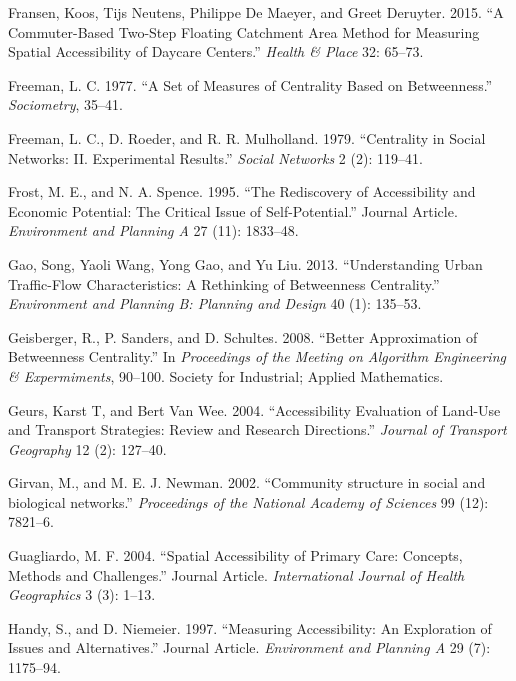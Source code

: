 \documentclass[]{elsarticle} %
\begin{document}
\leavevmode\hypertarget{ref-fransen2015commuter}{}%
Fransen, Koos, Tijs Neutens, Philippe De Maeyer, and Greet Deruyter.
2015. ``A Commuter-Based Two-Step Floating Catchment Area Method for
Measuring Spatial Accessibility of Daycare Centers.'' \emph{Health \&
Place} 32: 65--73.

\leavevmode\hypertarget{ref-Freeman1977}{}%
Freeman, L. C. 1977. ``A Set of Measures of Centrality Based on
Betweenness.'' \emph{Sociometry}, 35--41.

\leavevmode\hypertarget{ref-Freeman1979}{}%
Freeman, L. C., D. Roeder, and R. R. Mulholland. 1979. ``Centrality in
Social Networks: II. Experimental Results.'' \emph{Social Networks} 2
(2): 119--41.

\leavevmode\hypertarget{ref-Frost1995}{}%
Frost, M. E., and N. A. Spence. 1995. ``The Rediscovery of Accessibility
and Economic Potential: The Critical Issue of Self-Potential.'' Journal
Article. \emph{Environment and Planning A} 27 (11): 1833--48.

\leavevmode\hypertarget{ref-gao2013understanding}{}%
Gao, Song, Yaoli Wang, Yong Gao, and Yu Liu. 2013. ``Understanding Urban
Traffic-Flow Characteristics: A Rethinking of Betweenness Centrality.''
\emph{Environment and Planning B: Planning and Design} 40 (1): 135--53.

\leavevmode\hypertarget{ref-Geisberger2008}{}%
Geisberger, R., P. Sanders, and D. Schultes. 2008. ``Better
Approximation of Betweenness Centrality.'' In \emph{Proceedings of the
Meeting on Algorithm Engineering \& Expermiments}, 90--100. Society for
Industrial; Applied Mathematics.

\leavevmode\hypertarget{ref-Geurs2004}{}%
Geurs, Karst T, and Bert Van Wee. 2004. ``Accessibility Evaluation of
Land-Use and Transport Strategies: Review and Research Directions.''
\emph{Journal of Transport Geography} 12 (2): 127--40.

\leavevmode\hypertarget{ref-Girvan2002community}{}%
Girvan, M., and M. E. J. Newman. 2002. ``Community structure in social
and biological networks.'' \emph{Proceedings of the National Academy of
Sciences} 99 (12): 7821--6.

\leavevmode\hypertarget{ref-Guagliardo2004}{}%
Guagliardo, M. F. 2004. ``Spatial Accessibility of Primary Care:
Concepts, Methods and Challenges.'' Journal Article. \emph{International
Journal of Health Geographics} 3 (3): 1--13.

\leavevmode\hypertarget{ref-Handy1997}{}%
Handy, S., and D. Niemeier. 1997. ``Measuring Accessibility: An
Exploration of Issues and Alternatives.'' Journal Article.
\emph{Environment and Planning A} 29 (7): 1175--94.
\end{document}
